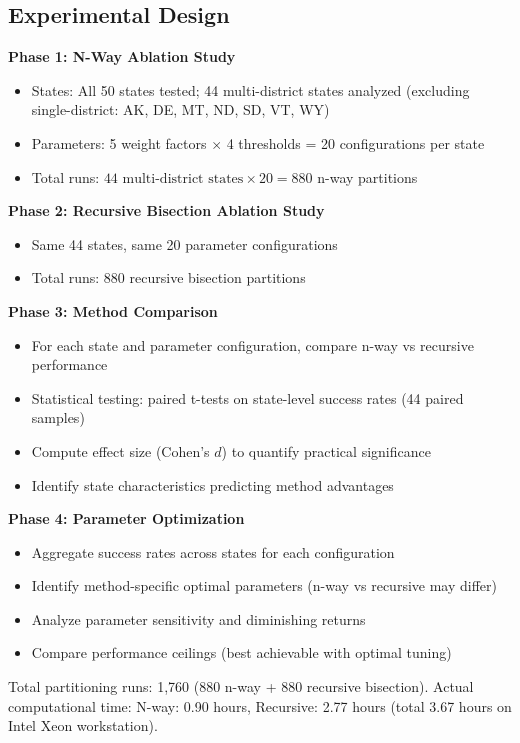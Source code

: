\subsection{Experimental Design}

\textbf{Phase 1: N-Way Ablation Study}
\begin{itemize}
\item States: All 50 states tested; 44 multi-district states analyzed (excluding single-district: AK, DE, MT, ND, SD, VT, WY)
\item Parameters: 5 weight factors $\times$ 4 thresholds = 20 configurations per state
\item Total runs: $44 \text{ multi-district states} \times 20 = 880$ n-way partitions
\end{itemize}

\textbf{Phase 2: Recursive Bisection Ablation Study}
\begin{itemize}
\item Same 44 states, same 20 parameter configurations
\item Total runs: 880 recursive bisection partitions
\end{itemize}

\textbf{Phase 3: Method Comparison}
\begin{itemize}
\item For each state and parameter configuration, compare n-way vs recursive performance
\item Statistical testing: paired t-tests on state-level success rates (44 paired samples)
\item Compute effect size (Cohen's $d$) to quantify practical significance
\item Identify state characteristics predicting method advantages
\end{itemize}

\textbf{Phase 4: Parameter Optimization}
\begin{itemize}
\item Aggregate success rates across states for each configuration
\item Identify method-specific optimal parameters (n-way vs recursive may differ)
\item Analyze parameter sensitivity and diminishing returns
\item Compare performance ceilings (best achievable with optimal tuning)
\end{itemize}

Total partitioning runs: 1,760 (880 n-way + 880 recursive bisection). Actual computational time: N-way: 0.90 hours, Recursive: 2.77 hours (total 3.67 hours on Intel Xeon workstation).
